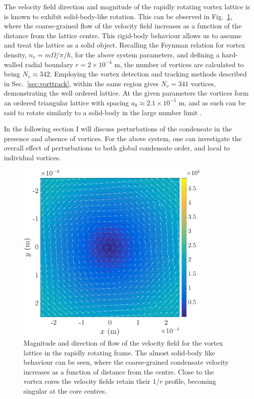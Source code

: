 The velocity field direction and magnitude of the rapidly rotating vortex lattice is is known to exhibit solid-body-like rotation. This can be observed in Fig.~\ref{fig:solidbody}, where the coarse-grained flow of the velocity field increases as a function of the distance from the lattice centre. This rigid-body behaviour allows us to assume and treat the lattice as a solid object. Recalling the Feynman relation for vortex density, $n_v = m\Omega/\pi/\hbar$, for the above system parameters, and defining a hard-walled radial boundary $r=2\times 10^{-4}$ m, the number of vortices are calculated to being $N_v \approx 342$. Employing the vortex detection and tracking methods described in Sec.~\ref{sec:vorttrack}, within the same region gives $N_v = 341$ vortices, demonstrating the well ordered lattice. At the given parameters the vortices form an ordered triangular lattice with spacing $a_0 \approx 2.1\times 10^{-5}$ m, and as such can be said to rotate similarly to a solid-body in the large number limit \cite{BEC:Fetter_rmp_2009}.

In the following section I will discuss perturbations of the condensate in the presence and absence of vortices. For the above system, one can investigate the overall effect of perturbations to both global condensate order, and local to individual vortices.

\begin{figure}\centering
    \includegraphics[width=0.85\textwidth,clip,trim={0cm 0cm 0 0cm}]{Images/ch4_vtx/velocity/solidbody}
    \caption{Magnitude and direction of flow of the velocity field for the vortex lattice in the rapidly rotating frame. The almost solid-body like behaviour can be seen, where the coarse-grained condensate velocity increases as a function of distance from the centre. Close to the vortex cores the velocity fields retain their $1/r$ profile, becoming singular at the core centres.}
    \label{fig:solidbody}
\end{figure}

